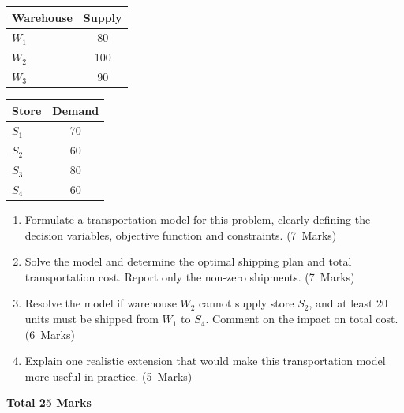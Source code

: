 \documentclass[11pt,a4paper]{article}
\newcommand{\markalloc}[1]{\nobreak\hfill\mbox{(#1 Marks)}}
\newcommand{\questiontotal}[1]{\begin{flushright}\textbf{Total #1 Marks}\end{flushright}}
\begin{document}
\begin{center}
\begin{tabular}{lc}
\toprule
Warehouse & Supply \\
\midrule
$W_1$ & 80 \\
$W_2$ & 100 \\
$W_3$ & 90 \\
\bottomrule
\end{tabular}
\hspace{1.5cm}
\begin{tabular}{lc}
\toprule
Store & Demand \\
\midrule
$S_1$ & 70 \\
$S_2$ & 60 \\
$S_3$ & 80 \\
$S_4$ & 60 \\
\bottomrule
\end{tabular}
\end{center}

\begin{enumerate}
\item Formulate a transportation model for this problem, clearly defining the decision variables, objective function and constraints. \markalloc{7}

\item Solve the model and determine the optimal shipping plan and total transportation cost. Report only the non-zero shipments. \markalloc{7}

\item Resolve the model if warehouse $W_2$ cannot supply store $S_2$, and at least 20 units must be shipped from $W_1$ to $S_4$. Comment on the impact on total cost. \markalloc{6}

\item Explain one realistic extension that would make this transportation model more useful in practice. \markalloc{5}
\end{enumerate}

\questiontotal{25}
\end{document}
